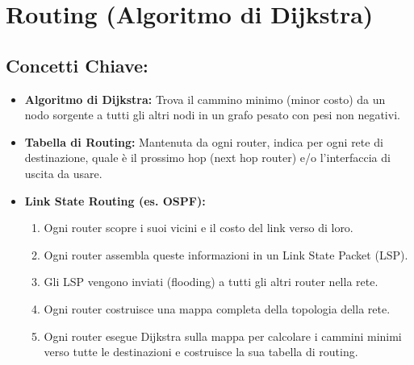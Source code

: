 \section{Routing (Algoritmo di Dijkstra)}

\subsection{Concetti Chiave:}
\begin{itemize}
    \item \textbf{Algoritmo di Dijkstra:} Trova il cammino minimo (minor costo) da un nodo sorgente a tutti gli altri nodi in un grafo pesato con pesi non negativi.
    \item \textbf{Tabella di Routing:} Mantenuta da ogni router, indica per ogni rete di destinazione, quale è il prossimo hop (next hop router) e/o l'interfaccia di uscita da usare.
    \item \textbf{Link State Routing (es. OSPF):}
    \begin{enumerate}
        \item Ogni router scopre i suoi vicini e il costo del link verso di loro.
        \item Ogni router assembla queste informazioni in un Link State Packet (LSP).
        \item Gli LSP vengono inviati (flooding) a tutti gli altri router nella rete.
        \item Ogni router costruisce una mappa completa della topologia della rete.
        \item Ogni router esegue Dijkstra sulla mappa per calcolare i cammini minimi verso tutte le destinazioni e costruisce la sua tabella di routing.
    \end{enumerate}
\end{itemize}

